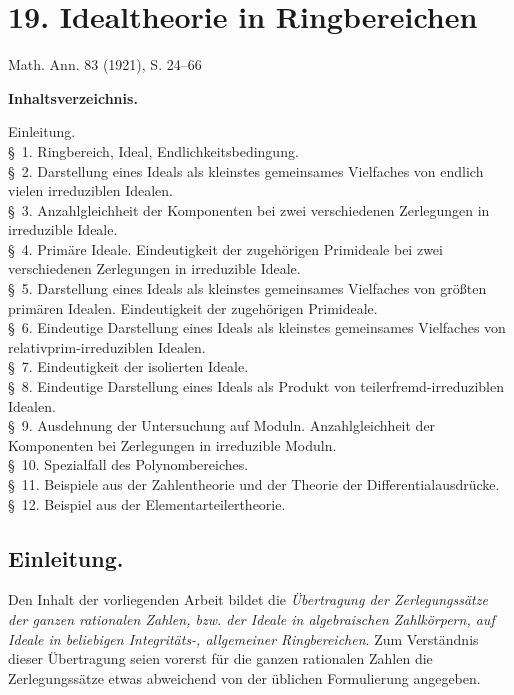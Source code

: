 \documentclass[11pt]{article}
\begin{document}
\clearpage

\setcounter{footnote}{0}
\section*{19. Idealtheorie in Ringbereichen}
\begin{center}
Math. Ann. 83 (1921), S. 24--66
\end{center}

\begin{center}\textbf{Inhaltsverzeichnis.}\end{center}
\noindent Einleitung.\\
\S~1. Ringbereich, Ideal, Endlichkeitsbedingung.\\
\S~2. Darstellung eines Ideals als kleinstes gemeinsames Vielfaches von endlich vielen irreduziblen Idealen.\\
\S~3. Anzahlgleichheit der Komponenten bei zwei verschiedenen Zerlegungen in irreduzible Ideale.\\
\S~4. Primäre Ideale. Eindeutigkeit der zugehörigen Primideale bei zwei verschiedenen Zerlegungen in irreduzible Ideale.\\
\S~5. Darstellung eines Ideals als kleinstes gemeinsames Vielfaches von größten primären Idealen. Eindeutigkeit der zugehörigen Primideale.\\
\S~6. Eindeutige Darstellung eines Ideals als kleinstes gemeinsames Vielfaches von relativprim-irreduziblen Idealen.\\
\S~7. Eindeutigkeit der isolierten Ideale.\\
\S~8. Eindeutige Darstellung eines Ideals als Produkt von teilerfremd-irreduziblen Idealen.\\
\S~9. Ausdehnung der Untersuchung auf Moduln. Anzahlgleichheit der Komponenten bei Zerlegungen in irreduzible Moduln.\\
\S~10. Spezialfall des Polynombereiches.\\
\S~11. Beispiele aus der Zahlentheorie und der Theorie der Differentialausdrücke.\\
\S~12. Beispiel aus der Elementarteilertheorie.

\subsection*{Einleitung.}
Den Inhalt der vorliegenden Arbeit bildet die \emph{Übertragung der Zerlegungssätze der ganzen rationalen Zahlen, bzw. der Ideale in algebraischen Zahlkörpern, auf Ideale in beliebigen Integritäts-, allgemeiner Ringbereichen}. Zum Verständnis dieser Übertragung seien vorerst für die ganzen rationalen Zahlen die Zerlegungssätze etwas abweichend von der üblichen Formulierung angegeben.
\end{document}
